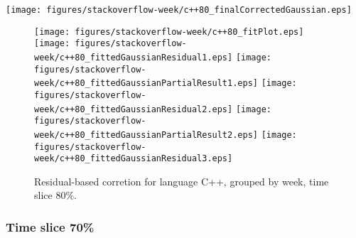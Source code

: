 \begin{center}
{\texttt{[image: figures/stackoverflow-week/c++80\_finalCorrectedGaussian.eps]}}
\end{center}

\FloatBarrier

\begin{figure}[t]
\centering
{}
{\texttt{[image: figures/stackoverflow-week/c++80\_fitPlot.eps]}}
{\texttt{[image: figures/stackoverflow-week/c++80\_fittedGaussianResidual1.eps]}}
{\texttt{[image: figures/stackoverflow-week/c++80\_fittedGaussianPartialResult1.eps]}}
{\texttt{[image: figures/stackoverflow-week/c++80\_fittedGaussianResidual2.eps]}}
{\texttt{[image: figures/stackoverflow-week/c++80\_fittedGaussianPartialResult2.eps]}}
{\texttt{[image: figures/stackoverflow-week/c++80\_fittedGaussianResidual3.eps]}}
\caption{Residual-based corretion for language C++, grouped by week, time slice 80\%.}
\end{figure}


\FloatBarrier


\subsubsection{Time slice 70\%}

